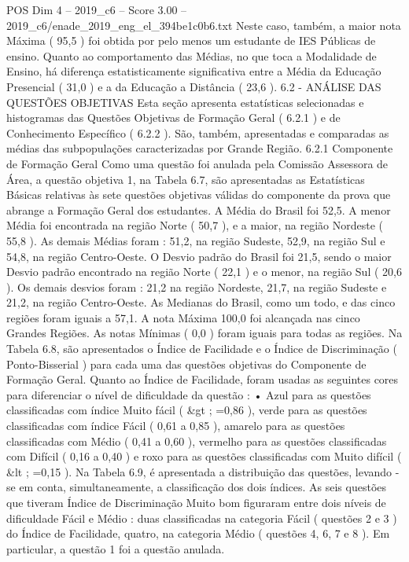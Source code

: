 \begin{textsample}{POS Dim 4 – 2019\_c6 – Score 3.00 – 2019\_c6/enade\_2019\_eng\_el\_394be1c0b6.txt}
Neste caso, também, a maior nota Máxima ( 95,5 ) foi obtida por pelo menos um estudante de IES Públicas de ensino.
Quanto ao comportamento das Médias, no que toca a Modalidade de Ensino, há diferença estatisticamente significativa entre a Média da Educação Presencial ( 31,0 ) e a da Educação a Distância ( 23,6 ). 6.2 - ANÁLISE DAS QUESTÕES OBJETIVAS Esta seção apresenta estatísticas selecionadas e histogramas das Questões Objetivas de Formação Geral ( 6.2.1 ) e de Conhecimento Específico ( 6.2.2 ).
São, também, apresentadas e comparadas as médias das subpopulações caracterizadas por Grande Região. 6.2.1 Componente de Formação Geral Como uma questão foi anulada pela Comissão Assessora de Área, a questão objetiva 1, na Tabela 6.7, são apresentadas as Estatísticas Básicas relativas às sete questões objetivas válidas do componente da prova que abrange a Formação Geral dos estudantes.
A Média do Brasil foi 52,5.
A menor Média foi encontrada na região Norte ( 50,7 ), e a maior, na região Nordeste ( 55,8 ).
As demais Médias foram : 51,2, na região Sudeste, 52,9, na região Sul e 54,8, na região Centro-Oeste.
O Desvio padrão do Brasil foi 21,5, sendo o maior Desvio padrão encontrado na região Norte ( 22,1 ) e o menor, na região Sul ( 20,6 ).
Os demais desvios foram : 21,2 na região Nordeste, 21,7, na região Sudeste e 21,2, na região Centro-Oeste.
As Medianas do Brasil, como um todo, e das cinco regiões foram iguais a 57,1.
A nota Máxima 100,0 foi alcançada nas cinco Grandes Regiões.
As notas Mínimas ( 0,0 ) foram iguais para todas as regiões.
Na Tabela 6.8, são apresentados o Índice de Facilidade e o Índice de Discriminação ( Ponto-Bisserial ) para cada uma das questões objetivas do Componente de Formação Geral.
Quanto ao Índice de Facilidade, foram usadas as seguintes cores para diferenciar o nível de dificuldade da questão : • Azul para as questões classificadas com índice Muito fácil ( \&gt ; =0,86 ), verde para as questões classificadas com índice Fácil ( 0,61 a 0,85 ), amarelo para as questões classificadas com Médio ( 0,41 a 0,60 ), vermelho para as questões classificadas com Difícil ( 0,16 a 0,40 ) e roxo para as questões classificadas com Muito difícil ( \&lt ; =0,15 ).
Na Tabela 6.9, é apresentada a distribuição das questões, levando -se em conta, simultaneamente, a classificação dos dois índices.
As seis questões que tiveram Índice de Discriminação Muito bom figuraram entre dois níveis de dificuldade Fácil e Médio : duas classificadas na categoria Fácil ( questões 2 e 3 ) do Índice de Facilidade, quatro, na categoria Médio ( questões 4, 6, 7 e 8 ).
Em particular, a questão 1 foi a questão anulada.

\end{textsample}
